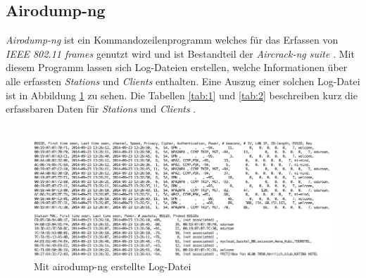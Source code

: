 \documentclass[]{report}
\begin{document}
\subsection{Airodump-ng}\label{lab:airodump-ng}
\textit{Airodump-ng} \cite{Airodump-ng} ist ein Kommandozeilenprogramm welches für das Erfassen von \textit{IEEE 802.11 frames} genutzt wird und ist Bestandteil der \textit{Aircrack-ng suite} \cite{Aircrack-ng}. Mit diesem Programm lassen sich Log-Dateien erstellen, welche Informationen über alle erfassten \textit{Stations} und \textit{Clients} enthalten. Eine Auszug einer solchen Log-Datei ist in Abbildung \ref{fig:log_file} zu sehen. Die Tabellen \ref{tab:1} und \ref{tab:2} beschreiben kurz die erfassbaren Daten für \textit{Stations} und \textit{Clients} \cite{Airodump-ng}.\\ \\
\begin{figure}
    \centering
    \includegraphics[width=5.0in]{bilder/log.png}
    \caption{Mit airodump-ng erstellte Log-Datei}
    \label{fig:log_file}
\end{figure}
\end{document}
